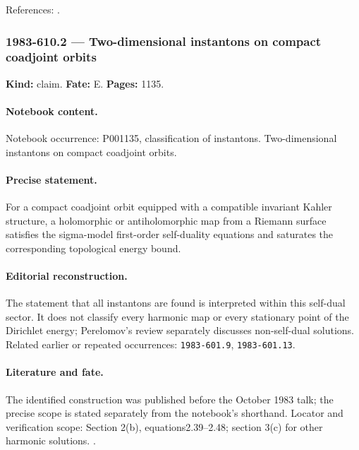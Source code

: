 \noindent References: \citep{perelomov1981instantons,novikov1982hamiltonian}.\par

\subsubsection{1983-610.2 --- Two-dimensional instantons on compact coadjoint orbits}

\label{item:1983-610.2}

\noindent\textbf{Kind:} claim. \textbf{Fate:} E. \textbf{Pages:} 1135.\par

\paragraph{Notebook content.} Notebook occurrence: P001135, classification of instantons. Two-dimensional instantons on compact coadjoint orbits.

\paragraph{Precise statement.} For a compact coadjoint orbit equipped with a compatible invariant Kahler structure, a holomorphic or antiholomorphic map from a Riemann surface satisfies the sigma-model first-order self-duality equations and saturates the corresponding topological energy bound.

\paragraph{Editorial reconstruction.} The statement that all instantons are found is interpreted within this self-dual sector. It does not classify every harmonic map or every stationary point of the Dirichlet energy; Perelomov's review separately discusses non-self-dual solutions. Related earlier or repeated occurrences: \texttt{1983-601.9}, \texttt{1983-601.13}.

\paragraph{Literature and fate.} The identified construction was published before the October 1983 talk; the precise scope is stated separately from the notebook's shorthand. Locator and verification scope: Section 2(b), equations2.39--2.48; section 3(c) for other harmonic solutions. \cite{perelomov1981instantons}.

